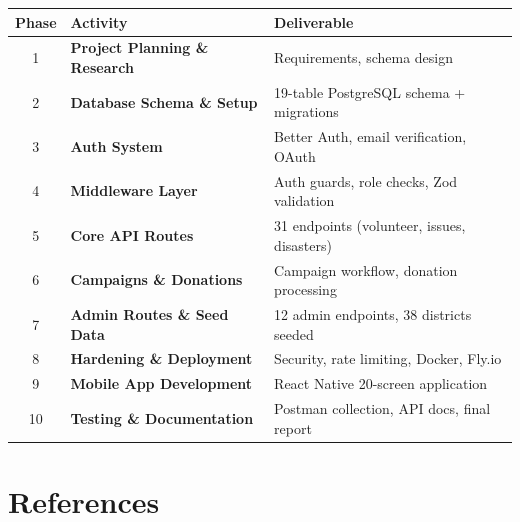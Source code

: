 \documentclass[12pt,a4paper]{article}
\begin{document}
\begin{center}
\begin{tabularx}{\textwidth}{c >{\bfseries}p{4.5cm} X}
\toprule
\textbf{Phase} & \textbf{Activity} & \textbf{Deliverable} \\
\midrule
1 & Project Planning \& Research & Requirements, schema design \\
2 & Database Schema \& Setup     & 19-table PostgreSQL schema + migrations \\
3 & Auth System                  & Better Auth, email verification, OAuth \\
4 & Middleware Layer             & Auth guards, role checks, Zod validation \\
5 & Core API Routes              & 31 endpoints (volunteer, issues, disasters) \\
6 & Campaigns \& Donations       & Campaign workflow, donation processing \\
7 & Admin Routes \& Seed Data    & 12 admin endpoints, 38 districts seeded \\
8 & Hardening \& Deployment      & Security, rate limiting, Docker, Fly.io \\
9 & Mobile App Development       & React Native 20-screen application \\
10& Testing \& Documentation     & Postman collection, API docs, final report \\
\bottomrule
\end{tabularx}
\end{center}

\section{References}
\end{document}
